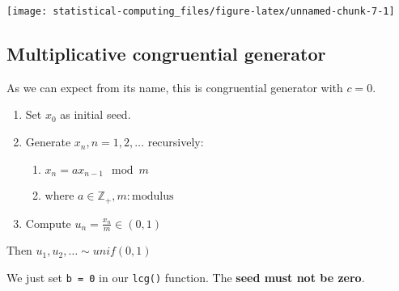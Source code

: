 \documentclass[]{book}
\newenvironment{Shaded}{\begin{snugshade}}{\end{snugshade}}
\newcommand{\KeywordTok}[1]{\textcolor[rgb]{0.13,0.29,0.53}{\textbf{#1}}}
\newcommand{\DataTypeTok}[1]{\textcolor[rgb]{0.13,0.29,0.53}{#1}}
\newcommand{\DecValTok}[1]{\textcolor[rgb]{0.00,0.00,0.81}{#1}}
\newcommand{\StringTok}[1]{\textcolor[rgb]{0.31,0.60,0.02}{#1}}
\newcommand{\OperatorTok}[1]{\textcolor[rgb]{0.81,0.36,0.00}{\textbf{#1}}}
\newcommand{\NormalTok}[1]{#1}
\providecommand{\tightlist}{%
  \setlength{\itemsep}{0pt}\setlength{\parskip}{0pt}}
\theoremstyle{definition}
\theoremstyle{definition}
\theoremstyle{definition}
\theoremstyle{remark}
\begin{document}
\begin{center}\texttt{[image: statistical-computing\_files/figure-latex/unnamed-chunk-7-1]} \end{center}

\subsection{Multiplicative congruential
generator}\label{multiplicative-congruential-generator}

As we can expect from its name, this is congruential generator with
\(c = 0\).

\begin{enumerate}
\def\labelenumi{\arabic{enumi}.}
\tightlist
\item
  Set \(x_0\) as initial seed.
\item
  Generate \(x_n, n = 1, 2, \ldots\) recursively:

  \begin{enumerate}
  \def\labelenumii{\alph{enumii}.}
  \tightlist
  \item
    \(x_n = a x_{n - 1} \mod m\)
  \item
    where \(a \in \mathbb{Z}_{+}, m: \text{modulus}\)
  \end{enumerate}
\item
  Compute \(u_n = \frac{x_n}{m} \in (0, 1)\)
\end{enumerate}

Then \(u_1, u_2, \ldots \sim unif(0, 1)\)

We just set \texttt{b\ =\ 0} in our \texttt{lcg()} function. The
\textbf{seed must not be zero}.

\begin{Shaded}
\end{Shaded}
\end{document}
